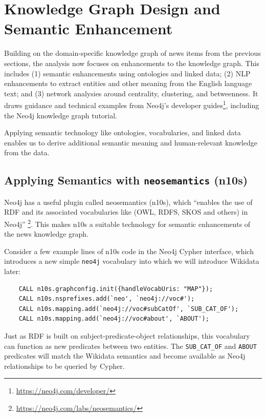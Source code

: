 \documentclass[11pt]{article}
\begin{document}
\section{Knowledge Graph Design and Semantic Enhancement}

Building on the domain-specific knowledge graph of news items from the previous sections, the analysis now focuses on enhancements to the knowledge graph. This includes (1) semantic enhancements using ontologies and linked data; (2) NLP enhancements to extract entities and other meaning from the English language text; and (3) network analysies around centrality, clustering, and betweenness. It draws guidance and technical examples from Neo4j's developer guides\footnote{\url{https://neo4j.com/developer/}}, including the Neo4j knowledge graph tutorial\cite{neo4j-kg-tutorial}.

Applying semantic technology like ontologies, vocabularies, and linked data enables us to derive additional semantic meaning and human-relevant knowledge from the data.

  \subsection{Applying Semantics with \lstinline{neosemantics} (n10s)}

  Neo4j has a useful plugin called neosemantics (n10s), which ``enables the use of RDF and its associated vocabularies like (OWL, RDFS, SKOS and others) in Neo4j'' \footnote{\url{https://neo4j.com/labs/neosemantics/}}. This makes n10s a suitable technology for semantic enhancements of the news knowledge graph.

  Consider a few example lines of n10s code in the Neo4j Cypher interface, which introduces a new simple \lstinline{neo4j} vocabulary into which we will introduce Wikidata later:

  \begin{lstlisting}
    CALL n10s.graphconfig.init({handleVocabUris: "MAP"});
    CALL n10s.nsprefixes.add(`neo', `neo4j://voc#');
    CALL n10s.mapping.add(`neo4j://voc#subCatOf', `SUB_CAT_OF');
    CALL n10s.mapping.add(`neo4j://voc#about', `ABOUT');
  \end{lstlisting}

  Just as RDF is built on subject-predicate-object relationships, this vocabulary can function as new predicates between two entities. The \lstinline{SUB_CAT_OF} and \lstinline{ABOUT} predicates will match the Wikidata semantics and become available as Neo4j relationships to be queried by Cypher.
\end{document}
